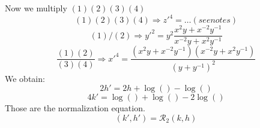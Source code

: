 \documentclass[../main/main.tex]{subfiles}
\begin{document}
Now we multiply \( (1)(2)(3)(4) \)
\begin{equation}
  (1)(2)(3)(4) \Rightarrow  z'^{4} = \dots (see notes)
\end{equation}
\begin{equation}
  (1)/(2) \Rightarrow y'^2 = y^2 \frac{x^2 y + x^{-2} y^{-1}}{ x^{-2}y + x^2 y^{-1}}
\end{equation}
\begin{equation}
  \frac{(1)(2)}{(3)(4)} \Rightarrow x'^4 = \frac{(x^2 y + x^{-2} y^{-1} ) (x^{-2}y + x^2 y^{-1}) }{(y+y^{-1})^2}
\end{equation}
We obtain:
\begin{equation}
  2 h' = 2 h + \log() - \log()
\end{equation}
\begin{equation}
  4 k' = \log() + \log() - 2\log()
\end{equation}
Those are the normalization equation.
\begin{equation}
  (k',h') = \mathcal{R}_2 (k,h)
\end{equation}
\end{document}

